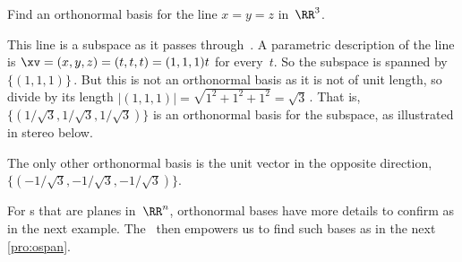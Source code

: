 \begin{example} \label{eg:orthbas1}
Find an orthonormal basis for the line \(x=y=z\) in~\(\RR^3\).
\begin{solution} 
This line is a subspace as it passes through~\ov.
A parametric description of the line is \(\xv=(x,y,z)=(t,t,t)=(1,1,1)t\) for every~\(t\). 
So the subspace is spanned by~\(\{(1,1,1)\}\)\,.
But this is not an orthonormal basis as it is not of unit length, so divide by its length \(|(1,1,1)|=\sqrt{1^2+1^2+1^2}=\sqrt3\)\,.
That is, \(\{(1/{\sqrt3},1/{\sqrt3},1/{\sqrt3})\}\) is an orthonormal basis for the subspace, as illustrated in stereo below.
\begin{center}
 {}
\end{center}
The only other orthonormal basis is the unit vector in the opposite direction,~\(\{(-1/{\sqrt3},-1/{\sqrt3},-1/{\sqrt3})\}\).
\end{solution}
\end{example}


For s that are planes in~\(\RR^n\), orthonormal bases have more details to confirm as in the next example.
The \svd\ then empowers us to find such bases as in the next \cref{pro:ospan}.


